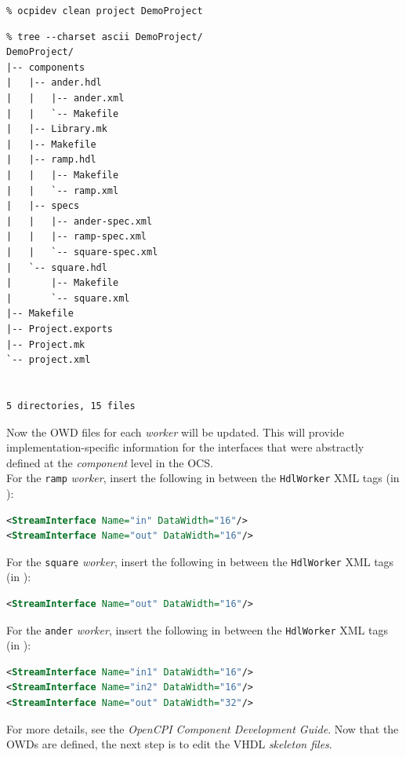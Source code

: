 \forceindent\verb+% ocpidev clean project DemoProject+\\
\OcpidevClean

\begin{verbatim}
% tree --charset ascii DemoProject/
DemoProject/
|-- components
|   |-- ander.hdl
|   |   |-- ander.xml
|   |   `-- Makefile
|   |-- Library.mk
|   |-- Makefile
|   |-- ramp.hdl
|   |   |-- Makefile
|   |   `-- ramp.xml
|   |-- specs
|   |   |-- ander-spec.xml
|   |   |-- ramp-spec.xml
|   |   `-- square-spec.xml
|   `-- square.hdl
|       |-- Makefile
|       `-- square.xml
|-- Makefile
|-- Project.exports
|-- Project.mk
`-- project.xml


5 directories, 15 files
\end{verbatim}
\bend

Now the OWD files for each \textit{worker} will be updated. This will provide implementation-specific information for the interfaces that were abstractly defined at the \textit{component} level in the OCS.\\
\bstart
For the \verb+ramp+ \textit{worker}, insert the following in between the \verb+HdlWorker+ XML tags (in ):

\begin{lstlisting}[language=xml]
<StreamInterface Name="in" DataWidth="16"/>
<StreamInterface Name="out" DataWidth="16"/>
\end{lstlisting}
\bend
\bstart
For the \verb+square+ \textit{worker}, insert the following in between the \verb+HdlWorker+ XML tags (in ):

\begin{lstlisting}[language=xml]
<StreamInterface Name="out" DataWidth="16"/>
\end{lstlisting}
\bend
\bstart
For the \verb+ander+ \textit{worker}, insert the following in between the \verb+HdlWorker+ XML tags (in ):

\begin{lstlisting}[language=xml]
<StreamInterface Name="in1" DataWidth="16"/>
<StreamInterface Name="in2" DataWidth="16"/>
<StreamInterface Name="out" DataWidth="32"/>
\end{lstlisting}
\bend

For more details, see the \textit{OpenCPI Component Development Guide}. Now that the OWDs are defined, the next step is to edit the VHDL \textit{skeleton files}.

